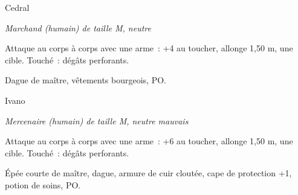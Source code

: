 \documentclass[a4paper,10pt,openany]{book}
\begin{document}
\begin{multicols}{2}
\begin{monsterbox}{Cedral}
	\begin{hangingpar}
		\textit{Marchand (humain) de taille M, neutre}
	\end{hangingpar}
	\dndline%
	\basics[%
	armorclass = 11,
	hitpoints  = \dice{4d8},
	speed      = 9 m
	]
	\dndline%
	\stats[
	DEX = \stat{12},
	INT = \stat{14},
	WIS = \stat{14} 
	]
	\dndline%
	\details[%
	skills={Histoire +4, Perspicacité +4, Persuasion +2},
	senses= Perception passive 12,
	languages = {bas-thrain, vethrain, nothrain, haut-thrain},
	challenge= 1/4
	]
	\dndline%
	\begin{monsteraction}[Dague]
		Attaque au corps à corps avec une arme : +4 au toucher, allonge 1,50 m, une cible. Touché :  dégâts perforants.
	\end{monsteraction}
	\dndline%
	\begin{monsteraction}[Possessions]
		Dague de maître, vêtements bourgeois,  PO.
	\end{monsteraction}
\end{monsterbox}

\begin{monsterbox}{Ivano}
	\begin{hangingpar}
		\textit{Mercenaire (humain) de taille M, neutre mauvais}
	\end{hangingpar}
	\dndline%
	\basics[%
	armorclass = {14 (armure de cuir cloutée, cape de protection)},
	hitpoints  = \dice{5d8 + 10},
	speed      = 9 m
	]
	\dndline%
	\stats[
	STR = \stat{16},
	DEX = \stat{12},
	CON = \stat{14}
	]
	\dndline%
	\details[%
	skills={Athlétisme +5, Intimidation +2},
	senses= Perception passive 12,
	languages = {bas-thrain, nothrain},
	challenge= 1/2
	]
	\dndline%
	\begin{monsteraction}
		Attaque au corps à corps avec une arme : +6 au toucher, allonge 1,50 m, une cible. Touché :  dégâts perforants.
	\end{monsteraction}
	\dndline%
	\begin{monsteraction}[Possessions]
		Épée courte de maître, dague, armure de cuir cloutée, cape de protection +1, potion de soins,  PO.
	\end{monsteraction}
\end{monsterbox}


\end{multicols}
\end{document}
